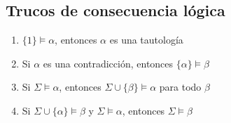 \documentclass{article}
\begin{document}
\subsection{Trucos de consecuencia lógica}
\begin{enumerate}
    \item $\{ 1 \} \models{} \alpha{}$, entonces $\alpha$ es una tautología
    \item Si $\alpha$ es una contradicción, entonces $\{ \alpha{} \} \models{} \beta{}$
    \item Si $\Sigma{} \models{} \alpha{}$, entonces $\Sigma{} \cup{} \{ \beta{} \} \models{} \alpha{}$ para todo $\beta$
    \item Si $\Sigma{} \cup{} \{ \alpha{} \} \models{} \beta{}$ y $\Sigma{} \models{} \alpha{}$, entonces $\Sigma{} \models{} \beta{}$
\end{enumerate}
\end{document}
